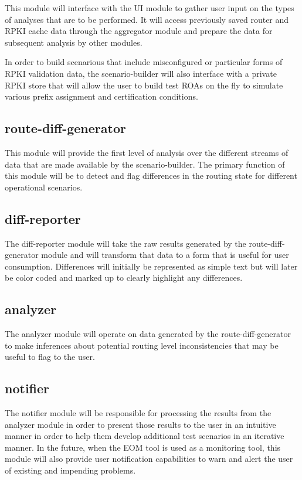 This module will interface with the UI module to gather user input on
the types of analyses that are to be performed. It will access previously
saved router and RPKI cache data through the aggregator module and
prepare the data for subsequent analysis by other modules.

In order to build scenarious that include misconfigured or particular
forms of RPKI validation data, the scenario-builder will also interface
with a private RPKI store that will allow the user to build test ROAs on
the fly to simulate various prefix assignment and certification
conditions.

\subsection{route-diff-generator}

This module will provide the first level of analysis over the different
streams of data that are made available by the scenario-builder.
The primary function of this module will be to detect and flag
differences in the routing state for different operational scenarios.

\subsection{diff-reporter}

The diff-reporter module will take the raw results generated by the
route-diff-generator module and will transform that data to a form that
is useful for user consumption. Differences will initially be represented as
simple text but will later be color coded and marked up to clearly
highlight any differences. 

\subsection{analyzer}

The analyzer module will operate on data generated by the
route-diff-generator to make inferences about potential routing level
inconsistencies that may be useful to flag to the user. 

\subsection{notifier}

The notifier module will be responsible for processing the results from 
the analyzer module in order to present those results to the user in an
intuitive manner in order to help them develop additional test scenarios
in an iterative manner. In the future, when the EOM tool is used as a
monitoring tool, this module will also provide user notification
capabilities to warn and alert the user of existing and impending
problems.

